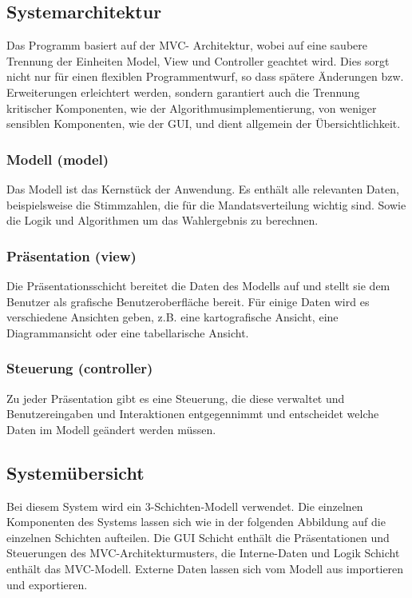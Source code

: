 \documentclass[10pt,a4paper]{article}
\begin{document}
\subsection{Systemarchitektur}
Das Programm basiert auf der MVC- Architektur, wobei auf eine saubere Trennung der Einheiten Model, View und Controller geachtet wird. Dies sorgt nicht nur für einen flexiblen Programmentwurf, so dass spätere Änderungen bzw. Erweiterungen erleichtert werden, sondern garantiert auch die Trennung kritischer Komponenten, wie der Algorithmusimplementierung, von weniger sensiblen Komponenten, wie der GUI, und dient allgemein der Übersichtlichkeit.

\subsubsection{Modell (model)}
Das Modell ist das Kernstück der Anwendung. Es enthält alle relevanten Daten, beispielsweise die Stimmzahlen, die für die Mandatsverteilung wichtig sind. Sowie die Logik und Algorithmen um das Wahlergebnis zu berechnen.

\subsubsection{Präsentation (view)}
Die Präsentationsschicht bereitet die Daten des Modells auf und stellt sie dem Benutzer als grafische Benutzeroberfläche bereit. Für einige Daten wird es verschiedene Ansichten geben, z.B. eine kartografische Ansicht, eine Diagrammansicht oder eine tabellarische Ansicht.

\subsubsection{Steuerung (controller)}
Zu jeder Präsentation gibt es eine Steuerung, die diese verwaltet und Benutzereingaben und Interaktionen entgegennimmt und entscheidet welche Daten im Modell geändert werden müssen.

\subsection{Systemübersicht}
Bei diesem System wird ein 3-Schichten-Modell verwendet. Die einzelnen Komponenten des Systems lassen sich wie in der folgenden Abbildung auf die einzelnen Schichten aufteilen.
Die GUI Schicht enthält die Präsentationen und Steuerungen des MVC-Architekturmusters, die Interne-Daten und Logik Schicht enthält das MVC-Modell. Externe Daten lassen sich vom Modell aus importieren und exportieren.
\end{document}
